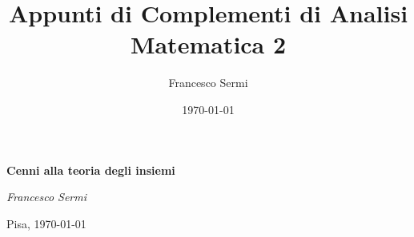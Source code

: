 \documentclass[12pt, twoside, italian, openany]{book}
\title{Appunti di Complementi di Analisi Matematica 2}
\author{Francesco Sermi}
\date{\today}
\begin{document}
	\begin{titlepage}
	\centering
	\vspace*{3cm}
	{\huge\bfseries Cenni alla teoria degli insiemi \par}
	\vspace{2cm}
	{\Large\itshape Francesco Sermi\par}
	\vfill




	\vfill	
	{\large \hfill Pisa, \today \par}
	\end{titlepage}
\end{document}
